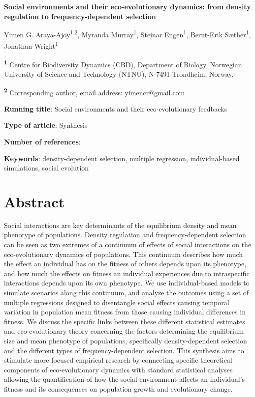 \documentclass{article}
\begin{document}
\begin{center}
\large
\textbf{Social environments and their eco-evolutionary dynamics: from density regulation to frequency-dependent selection}
\end{center}

\begin{center}
	Yimen G. Araya-Ajoy\textsuperscript{1,2}, Myranda Murray\textsuperscript{1}, Steinar Engen\textsuperscript{1}, Bernt-Erik Sæther\textsuperscript{1}, Jonathan Wright\textsuperscript{1}
\end{center}

\bigskip
\noindent \textsuperscript{\textbf{1}} Centre for Biodiversity Dynamics (CBD), Department of Biology, Norwegian University of Science and Technology (NTNU), N-7491 Trondheim, Norway.

\noindent \textsuperscript{\textbf{2}} Corresponding author, email address: yimencr@gmail.com

\bigskip
\noindent \textbf{Running title}: Social environments and their eco-evolutionary feedbacks  

\bigskip
\noindent \textbf{Type of article}: Synthesis

\noindent \textbf{Number of references}: \ 

\bigskip
\noindent \textbf{Keywords}: density-dependent selection, multiple regression, individual-based simulations, social evolution


\newpage
\section{Abstract} 

Social interactions are key determinants of the equilibrium density and mean phenotype of populations. Density regulation and frequency-dependent selection can be seen as two extremes of a continuum of effects of social interactions on the eco-evolutionary dynamics of populations. This continuum  describes how much the effect an individual has on the fitness of others depends upon its phenotype, and how much the effects on fitness an individual experiences due to intraspecific interactions depends upon its own phenotype. We use individual-based models to simulate scenarios along this continuum, and analyze the outcomes using a set of multiple regressions designed to disentangle social effects causing temporal variation in population mean fitness from those causing individual differences in fitness. We discuss the specific links between these different statistical estimates and eco-evolutionary theory concerning the factors determining the equilibrium size and mean phenotype of populations, specifically density-dependent selection and the different types of frequency-dependent selection. This synthesis aims to stimulate more focused empirical research by connecting specific theoretical components of eco-evolutionary dynamics with standard statistical analyses allowing the quantification of how the social environment affects an individual's fitness and its consequences on population growth and evolutionary change. 
\end{document}
